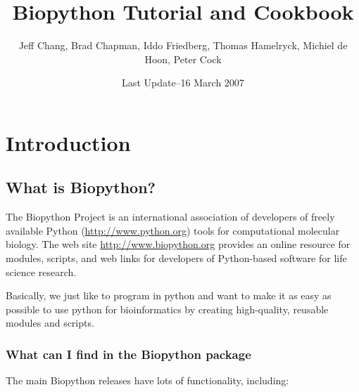 \documentclass{report}
\begin{document}
\title{Biopython Tutorial and Cookbook}
\author{Jeff Chang, Brad Chapman, Iddo Friedberg, Thomas Hamelryck, Michiel de Hoon, Peter Cock}
\date{Last Update--16 March 2007}

\maketitle
\tableofcontents

\chapter{Introduction}

\section{What is Biopython?}

The Biopython Project is an international association of developers of freely available Python (\url{http://www.python.org}) tools for computational molecular biology. The web site \url{http://www.biopython.org} provides an online resource for modules, scripts, and web links for developers of Python-based software for life science research.

Basically, we just like to program in python and want to make it as easy as possible to use python for bioinformatics by creating high-quality, reusable modules and scripts.

\subsection{What can I find in the Biopython package}

The main Biopython releases have lots of functionality, including:
\end{document}
